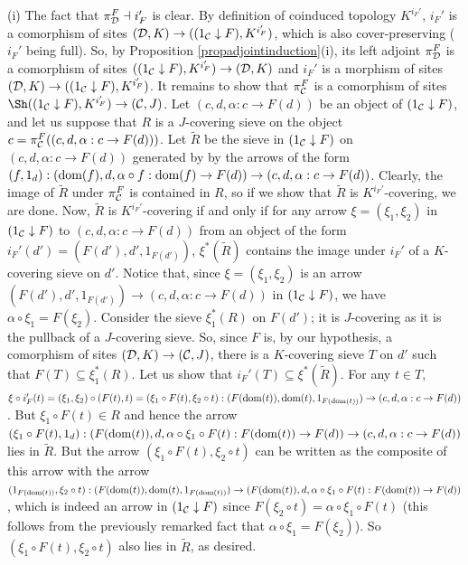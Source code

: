 \documentclass[a4paper,12pt]{article}
\begin{document}
\begin{proofs}
	(i) The fact that $\pi_{\cal D}^{F} \dashv i_{F}'$ is clear. By definition of coinduced topology $K^{i_{F}'}$, $i_{F}'$ is a comorphism of sites $({\cal D}, K) \to ((1_{\cal C}\downarrow F), K^{i_{F}'})$, which is also cover-preserving ($i_{F}'$ being full). So, by Proposition \ref{propadjointinduction}(i), its left adjoint $\pi_{\cal D}^{F}$ is a comorphism of sites  $((1_{\cal C}\downarrow F), K^{i_{F}'}) \to ({\cal D}, K)$ and $i_{F}'$ is a morphism of sites $({\cal D}, K) \to ((1_{\cal C}\downarrow F), K^{i_{F}'})$. It remains to show that $\pi_{\cal C}^{F}$ is a comorphism of sites $\Sh((1_{\cal C}\downarrow F), K^{i_{F}'}) \to ({\cal C}, J)$. Let $(c, d, \alpha:c\to F(d))$ be an object of $(1_{\cal C}\downarrow F)$, and let us suppose that $R$ is a $J$-covering sieve on the object $c=\pi_{\cal C}^{F}((c, d, \alpha:c\to F(d)))$. Let $\tilde{R}$ be the sieve in $(1_{\cal C}\downarrow F)$ on $(c, d, \alpha:c\to F(d))$ generated by by the arrows of the form $(f, 1_{d}):(\textup{dom}(f), d, \alpha\circ f:\textup{dom}(f) \to F(d))\to (c, d, \alpha:c\to F(d))$. Clearly, the image of $\tilde{R}$ under $\pi_{\cal C}^{F}$ is contained in $R$, so if we show that $\tilde{R}$ is $K^{i_{F}'}$-covering, we are done. Now, $\tilde{R}$ is $K^{i_{F}'}$-covering if and only if for any arrow $\xi=(\xi_{1}, \xi_{2})$ in $(1_{\cal C}\downarrow F)$ to $(c, d, \alpha:c\to F(d))$ from an object of the form $i_{F}'(d')=(F(d'),d', 1_{F(d')})$, $\xi^{\ast}(\tilde{R})$ contains the image under $i_{F}'$ of a $K$-covering sieve on $d'$. Notice that, since $\xi=(\xi_{1}, \xi_{2})$ is an arrow $(F(d'),d', 1_{F(d')})\to (c, d, \alpha:c\to F(d))$ in $(1_{\cal C}\downarrow F)$, we have $\alpha\circ \xi_{1}=F(\xi_{2})$.  
	Consider the sieve $\xi_{1}^{\ast}(R)$ on $F(d')$; it is $J$-covering as it is the pullback of a $J$-covering sieve. So, since $F$ is, by our hypothesis, a comorphism of sites $({\cal D}, K)\to ({\cal C}, J)$, there is a $K$-covering sieve $T$ on $d'$ such that $F(T)\subseteq \xi_{1}^{\ast}(R)$. Let us show that $i_{F}'(T)\subseteq \xi^{\ast}(\tilde{R})$. For any $t\in T$, $\xi\circ i_{F}'(t)=(\xi_{1}, \xi_{2})\circ (F(t), t)=(\xi_{1}\circ F(t), \xi_{2}\circ t):(F(\textup{dom}(t)),\textup{dom}(t), 1_{F(\textup{dom}(t))}) \to (c, d, \alpha:c\to F(d))$. But $\xi_{1}\circ F(t)\in R$ and hence the arrow $(\xi_{1}\circ F(t), 1_{d}):(F(\textup{dom}(t)), d, \alpha\circ \xi_{1}\circ F(t): F(\textup{dom}(t))\to F(d))\to (c, d, \alpha:c\to F(d))$ lies in $\tilde{R}$. But the arrow $(\xi_{1}\circ F(t), \xi_{2}\circ t)$ can be written as the composite of this arrow with the arrow $(1_{F(\textup{dom}(t))}, \xi_{2}\circ t):(F(\textup{dom}(t)), \textup{dom}(t), 1_{F(\textup{dom}(t))})\to (F(\textup{dom}(t)), d, \alpha\circ \xi_{1}\circ F(t):F(\textup{dom}(t))\to F(d))$, which is indeed an arrow in $(1_{\cal C}\downarrow F)$ since $F(\xi_{2}\circ t)=\alpha \circ \xi_{1}\circ F(t)$ (this follows from the previously remarked fact that $\alpha\circ \xi_{1}=F(\xi_{2})$). So $(\xi_{1}\circ F(t), \xi_{2}\circ t)$ also lies in $\tilde{R}$, as desired.   
	

\end{proofs}
\end{document}
